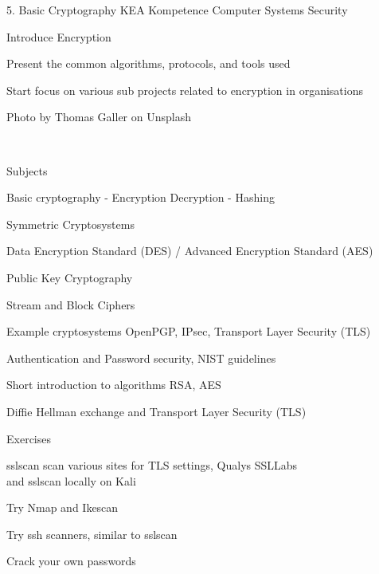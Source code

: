 \documentclass[Screen16to9,17pt]{foils}
\begin{document}
\mytitlepage
{5. Basic Cryptography}
{KEA Kompetence Computer Systems Security \the\year}





\begin{list2}
\item Introduce Encryption
\item Present the common algorithms, protocols, and tools used
\item Start focus on various sub projects related to encryption in organisations
\end{list2}

{\small Photo by Thomas Galler on Unsplash}


{~}

\begin{list1}
\item Subjects
\begin{list2}
\item Basic cryptography - Encryption Decryption - Hashing
\item Symmetric Cryptosystems
\item Data Encryption Standard (DES) / Advanced Encryption Standard (AES)
\item Public Key Cryptography
\item Stream and Block Ciphers
\item Example cryptosystems OpenPGP, IPsec, Transport Layer Security (TLS)
\item Authentication and Password security, NIST guidelines
\item Short introduction to algorithms RSA, AES
\item Diffie Hellman exchange and Transport Layer Security (TLS)
\end{list2}
\end{list1}

\begin{list1}
\item Exercises
\begin{list2}
\item sslscan scan various sites for TLS settings, Qualys SSLLabs\\
 and sslscan locally on Kali
\item Try Nmap and Ikescan
\item Try ssh scanners, similar to sslscan
\item Crack your own passwords
\end{list2}
\end{list1}
\end{document}
